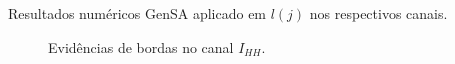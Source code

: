 \documentclass[10pt]{beamer}
\begin{document}
\begin{frame}{Resultados numéricos}
\alert{GenSA aplicado em $l(j)$ nos respectivos canais.}
\begin{figure}[hbt]
\caption{Evidências de bordas no canal $I_{HH}$.}
\endminipage\hfill
{}

\end{figure}
\end{frame}
\end{document}
